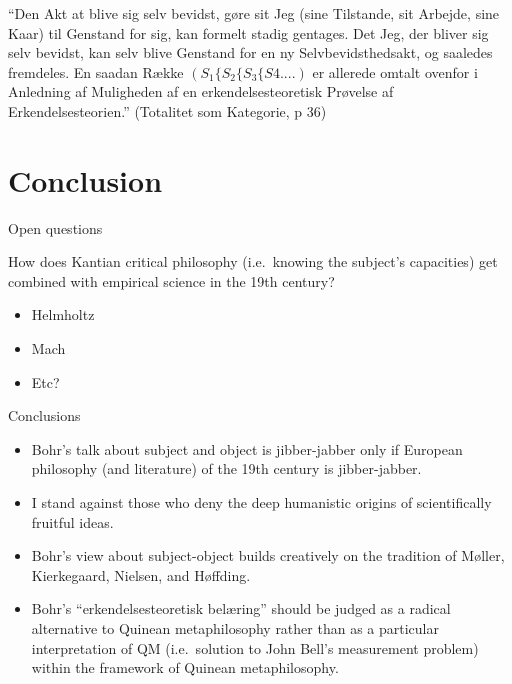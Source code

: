 \documentclass[ignorenonframetext, ]{beamer}
\begin{document}
\begin{frame}

  ``Den Akt at blive sig selv bevidst, gøre sit Jeg (sine Tilstande,
  sit Arbejde, sine Kaar) til Genstand for sig, kan formelt stadig
  gentages. Det Jeg, der bliver sig selv bevidst, kan selv blive
  Genstand for en ny Selvbevidsthedsakt, og saaledes fremdeles. En
  saadan Række $(S_1 \{ S_2 \{ S_3 \{ S4 ....)$ er allerede omtalt
  ovenfor i Anledning af Muligheden af en erkendelsesteoretisk
  Prøvelse af Erkendelsesteorien.'' (Totalitet som Kategorie, p 36)

\end{frame}

\section{Conclusion}


\begin{frame}{Open questions}

  How does Kantian critical philosophy (i.e.\ knowing the subject's
  capacities) get combined with empirical science in the 19th century?
  \begin{itemize}
  \item Helmholtz
  \item Mach
  \item Etc?
  \end{itemize}

\end{frame}

\begin{frame}{Conclusions}

  \begin{itemize}
  \item Bohr's talk about subject and object is jibber-jabber only if
    European philosophy (and literature) of the 19th century is
    jibber-jabber.
  \item I stand against those who deny the deep humanistic origins of
    scientifically fruitful ideas.
  \item Bohr's view about subject-object builds creatively on the
    tradition of Møller, Kierkegaard, Nielsen, and Høffding.
  \item Bohr's ``erkendelsesteoretisk belæring'' should be judged as a
    radical alternative to Quinean metaphilosophy rather than as a
    particular interpretation of QM (i.e.\ solution to John Bell's
    measurement problem) within the framework of Quinean
    metaphilosophy.
  \end{itemize}


\end{frame}
\end{document}
